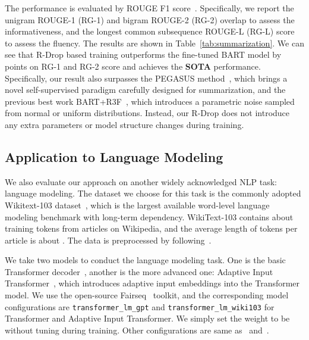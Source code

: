 \documentclass{article}
\begin{document}
The performance is evaluated by ROUGE F1 score~\cite{lin2002manual}.
Specifically, we report the unigram ROUGE-1 (RG-1) and bigram ROUGE-2 (RG-2) overlap to assess the informativeness, and the longest common subsequence ROUGE-L (RG-L) score to assess the fluency. 
The results are shown in Table~\ref{tab:summarization}. We can see that R-Drop based training outperforms the fine-tuned BART model by  points on RG-1 and RG-2 score and achieves the {\bf SOTA} performance. 
Specifically, our result also surpasses the PEGASUS method~\cite{zhang2020pegasus}, which brings a novel self-supervised paradigm carefully designed for summarization, and the previous best work BART+R3F~\cite{aghajanyan2020better}, which introduces a parametric noise sampled from normal or uniform distributions. Instead, our R-Drop does not introduce any extra parameters or model structure changes during training.




\subsection{Application to Language Modeling}

 We also evaluate our approach on another widely acknowledged NLP task: language modeling. 
The dataset we choose for this task is the commonly adopted Wikitext-103 dataset~\cite{merity2016pointer}, which is the largest available word-level language modeling benchmark with long-term dependency. 
WikiText-103 contains about  training tokens from
 articles on Wikipedia, and the average length of tokens per article is about . 
The data is preprocessed by following~\cite{ott2019fairseq}.

We take two models to conduct the language modeling task. One is the basic Transformer decoder~\cite{vaswani2017attention}, another is the more advanced one: Adaptive Input Transformer~\cite{baevski2018adaptive}, which introduces adaptive input embeddings into the Transformer model. 
We use the open-source Fairseq~\cite{ott2019fairseq} toolkit, and the corresponding model configurations are \texttt{transformer\_lm\_gpt} and \texttt{transformer\_lm\_wiki103} for Transformer and Adaptive Input Transformer. 
We simply set the weight  to be  without tuning during training. Other configurations are same as~\cite{ott2019fairseq} and~\cite{baevski2018adaptive}.
\end{document}
